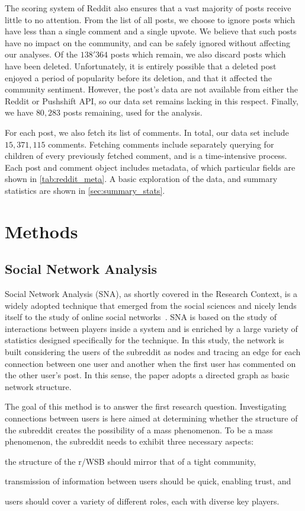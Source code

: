 \documentclass[noacm,sigconf,authorversion]{acmart}
\begin{document}
The scoring system of Reddit also ensures that a vast majority of posts receive little to no attention. 
From the list of all posts, we choose to ignore posts which have less than a single comment and a single upvote. 
We believe that such posts have no impact on the community, and can be safely ignored without affecting our analyses. 
Of the $138'364$ posts which remain, we also discard posts which have been deleted. 
Unfortunately, it is entirely possible that a deleted post enjoyed a period of popularity before its deletion, and that it affected the community sentiment. 
However, the post's data are not available from either the Reddit or Pushshift API, so our data set remains lacking in this respect. 
Finally, we have $80,283$ posts remaining, used for the analysis. 

For each post, we also fetch its list of comments. 
In total, our data set include $15,371,115$ comments.
Fetching comments include separately querying for children of every previously fetched comment, and is a time-intensive process.
Each post and comment object includes metadata, of which particular fields are shown in \autoref{tab:reddit_meta}.
A basic exploration of the data, and summary statistics are shown in \autoref{sec:summary_stats}.


\section{Methods}

\subsection{Social Network Analysis}
Social Network Analysis (SNA), as shortly covered in the Research Context, is a widely adopted technique that emerged from the social sciences and nicely lends itself to the study of online social networks~\cite{knoke2019social}. SNA is based on the study of interactions between players inside a system and is enriched by a large variety of statistics designed specifically for the technique. In this study, the network is built considering the users of the subreddit as nodes and tracing an edge for each connection between one user and another when the first user has commented on the other user's post. In this sense, the paper adopts a directed graph as basic network structure. 

The goal of this method is to answer the first research question. Investigating connections between users is here aimed at determining whether the structure of the subreddit creates the possibility of a mass phenomenon. To be a mass phenomenon, the subreddit needs to exhibit three necessary aspects:
\begin{inparaenum}
\item the structure of the r/WSB should mirror that of a tight community,
\item transmission of information between users should be quick, enabling trust, and 
\item users should cover a variety of different roles, each with diverse key players.
\end{inparaenum}
\end{document}
